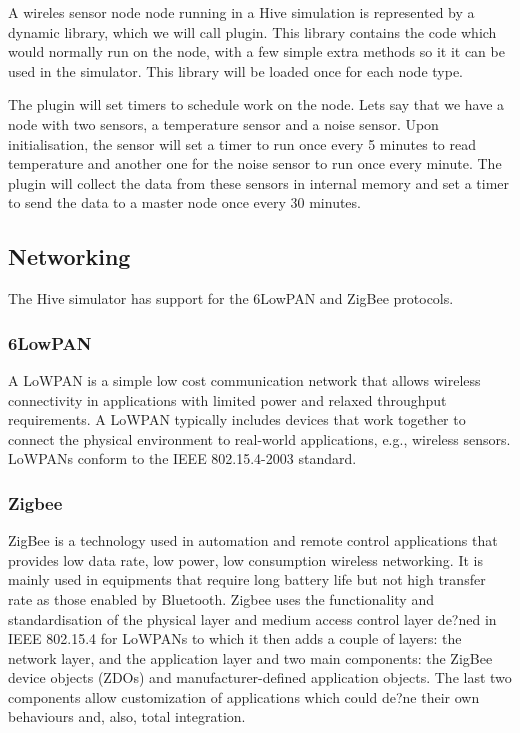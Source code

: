 
A wireles sensor node node running in a Hive simulation is 
represented by a dynamic library, which we will call plugin. This library contains the code 
which would normally run on the node, with a few simple extra methods
so it it can be used in the simulator. This library will be loaded once
for each node type.

The plugin will set timers to schedule work on the node. Lets say that we have
a node with two sensors, a temperature sensor and a noise sensor. Upon
initialisation, the sensor will set a timer to run once every 5 minutes to
read temperature and another one for the noise sensor to run once every
minute. The plugin will collect the data from these sensors in internal memory
and set a timer to send the data to a master node once every 30 minutes.

\subsection{Networking}

The Hive simulator has support for the 6LowPAN and ZigBee protocols.

\subsubsection{6LowPAN\cite{6lowpan}}
A LoWPAN is a simple low cost communication network that allows
wireless connectivity in applications with limited power and relaxed
throughput requirements.  A LoWPAN typically includes devices that
work together to connect the physical environment to real-world
applications, e.g., wireless sensors.  LoWPANs conform to the IEEE
802.15.4-2003 standard.


\subsubsection{Zigbee}
ZigBee is a technology used in automation and remote control applications that
provides low data rate, low power, low consumption wireless networking. It is mainly
used in equipments that require long battery life but not high transfer rate as those
enabled by Bluetooth.
Zigbee uses the functionality and standardisation of the physical layer and
medium access control layer de?ned in IEEE 802.15.4 for LoWPANs to which it then adds
a couple of layers: the network layer, and the application layer and two main
components: the ZigBee device objects (ZDOs) and manufacturer-defined application objects.
The last two components allow customization of applications which could de?ne
their own behaviours and, also, total integration.

